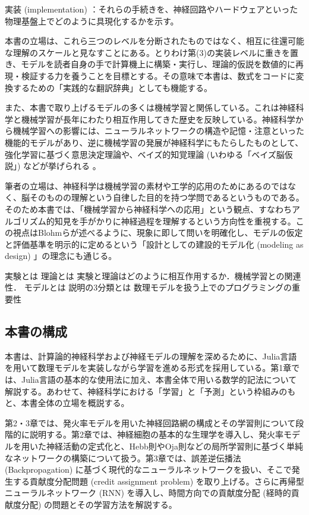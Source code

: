 \documentclass[titlepage]{ltjsbook}
\begin{document}
実装 (implementation) ：それらの手続きを、神経回路やハードウェアといった物理基盤上でどのように具現化するかを示す。

本書の立場は、これら三つのレベルを分断されたものではなく、相互に往還可能な理解のスケールと見なすことにある。とりわけ第(3)の実装レベルに重きを置き、モデルを読者自身の手で計算機上に構築・実行し、理論的仮説を数値的に再現・検証する力を養うことを目標とする。その意味で本書は、数式をコードに変換するための「実践的な翻訳辞典」としても機能する。

また、本書で取り上げるモデルの多くは機械学習と関係している。これは神経科学と機械学習が長年にわたり相互作用してきた歴史を反映している。神経科学から機械学習への影響には、ニューラルネットワークの構造や記憶・注意といった機能的モデルがあり、逆に機械学習の発展が神経科学にもたらしたものとして、強化学習に基づく意思決定理論や、ベイズ的知覚理論 (いわゆる「ベイズ脳仮説」) などが挙げられる \citep{Hassabis2017-zm}。

筆者の立場は、神経科学は機械学習の素材や工学的応用のためにあるのではなく、脳そのものの理解という自律した目的を持つ学問であるというものである。そのため本書では、「機械学習から神経科学への応用」という観点、すなわちアルゴリズム的知見を手がかりに神経過程を理解するという方向性を重視する。この視点はBlohmらが述べるように、現象に即して問いを明確化し、モデルの仮定と評価基準を明示的に定めるという「設計としての建設的モデル化 (modeling as design) 」の理念にも通じる。

実験とは
理論とは
実験と理論はどのように相互作用するか．機械学習との関連性．
モデルとは
説明の3分類とは
数理モデルを扱う上でのプログラミングの重要性

\subsection{本書の構成}
本書は、計算論的神経科学および神経モデルの理解を深めるために、Julia言語を用いて数理モデルを実装しながら学習を進める形式を採用している。第1章では、Julia言語の基本的な使用法に加え、本書全体で用いる数学的記法について解説する。あわせて、神経科学における「学習」と「予測」という枠組みのもと、本書全体の立場を概説する。

第2・3章では、発火率モデルを用いた神経回路網の構成とその学習則について段階的に説明する。第2章では、神経細胞の基本的な生理学を導入し、発火率モデルを用いた神経活動の定式化と、Hebb則やOja則などの局所学習則に基づく単純なネットワークの構築について扱う。第3章では、誤差逆伝播法 (Backpropagation) に基づく現代的なニューラルネットワークを扱い、そこで発生する貢献度分配問題 (credit assignment problem) を取り上げる。さらに再帰型ニューラルネットワーク (RNN) を導入し、時間方向での貢献度分配 (経時的貢献度分配) の問題とその学習方法を解説する。
\end{document}
